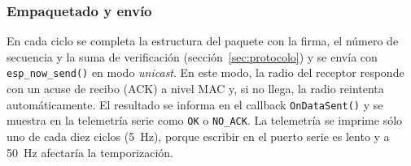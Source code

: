 \subsubsection{Empaquetado y envío}

En cada ciclo se completa la estructura del paquete con la firma, el número de secuencia y la suma de verificación (sección~\ref{sec:protocolo}) y se envía con \texttt{esp\_now\_send()} en modo \textit{unicast}. En este modo, la radio del receptor responde con un acuse de recibo (ACK) a nivel MAC y, si no llega, la radio reintenta automáticamente. El resultado se informa en el callback \texttt{OnDataSent()} y se muestra en la telemetría serie como \texttt{OK} o \texttt{NO\_ACK}. La telemetría se imprime sólo uno de cada diez ciclos (\SI{5}{\hertz}), porque escribir en el puerto serie es lento y a \SI{50}{\hertz} afectaría la temporización.
